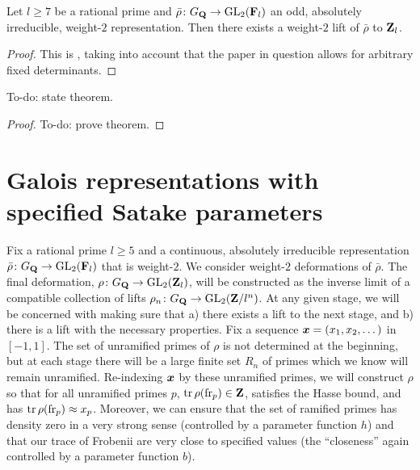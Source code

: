 \begin{theorem}\label{thm:always-can-lift}
Let $l\geqslant 7$ be a rational prime and 
$\bar\rho\colon G_{\mathbf{Q}} \to \operatorname{GL}_2(\mathbf{F}_l)$ an odd, absolutely irreducible, 
weight-$2$ representation. Then there exists a weight-$2$ lift of $\bar\rho$ to 
$\mathbf{Z}_l$. 
\end{theorem}
\begin{proof}
This is \cite[Th.~1]{ramakrishna-2002}, taking into account that the paper in 
question allows for arbitrary fixed determinants. 
\end{proof}

\begin{theorem}\label{thm:one-nice-prime}
To-do: state theorem.
\end{theorem}
\begin{proof}
To-do: prove theorem.
\end{proof}





\section{Galois representations with specified Satake parameters}

Fix a rational prime $l\geqslant 5$ and a continuous, absolutely irreducible 
representation $\bar\rho\colon G_{\mathbf{Q}} \to \operatorname{GL}_2(\mathbf{F}_l)$ that is weight-$2$. We 
consider weight-$2$ deformations of $\bar\rho$. The final deformation, 
$\rho\colon G_{\mathbf{Q}} \to \operatorname{GL}_2(\mathbf{Z}_l)$, will be constructed as the inverse limit 
of a compatible collection of lifts $\rho_n\colon G_{\mathbf{Q}} \to \operatorname{GL}_2(\mathbf{Z}/l^n)$. At 
any given stage, we will be concerned with making sure that a) there exists a 
lift to the next stage, and b) there is a lift with the necessary properties. 
Fix a sequence ${\boldsymbol x}=(x_1,x_2,\dots)$ in $[-1,1]$. The set of unramified primes 
of $\rho$ is not determined at the beginning, but at each stage there will be 
a large finite set $R_n$ of primes which we know will remain unramified. 
Re-indexing ${\boldsymbol x}$ by these unramified primes, we will construct $\rho$ so that 
for all unramified primes $p$, $\operatorname{tr}\rho(\mathrm{fr}_p)\in \mathbf{Z}$, satisfies the Hasse 
bound, and has $\operatorname{tr}\rho(\mathrm{fr}_p) \approx x_p$. Moreover, we can ensure that the 
set of ramified primes has density zero in a very strong sense (controlled by a 
parameter function $h$) and that our trace of Frobenii are very close to 
specified values (the ``closeness'' again controlled by a parameter function 
$b$). 

